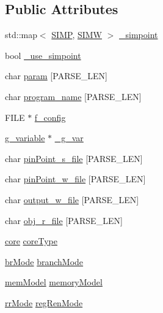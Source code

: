 \subsection*{Public Attributes}
\begin{DoxyCompactItemize}
\item 
std::map$<$ \hyperlink{global_2global_8h_a8de6a99590d1589b9e2eb7b208c517e8}{SIMP}, \hyperlink{global_2global_8h_ae8fb2e990993b1181540c8986c5d98e5}{SIMW} $>$ \hyperlink{classconfig_a66a2268284689ebce8e0fe2f87a2699d}{\_\-simpoint}
\item 
bool \hyperlink{classconfig_a2928e02fdf4716123e313e363e77875a}{\_\-use\_\-simpoint}
\item 
char \hyperlink{classconfig_adb1322ea6b15bd6c0387b2fe82e7c574}{param} \mbox{[}PARSE\_\-LEN\mbox{]}
\item 
char \hyperlink{classconfig_a344b61d2beb7dec897796ef42ed00010}{program\_\-name} \mbox{[}PARSE\_\-LEN\mbox{]}
\item 
FILE $\ast$ \hyperlink{classconfig_a3a5aaa62d616ead46e8b132c9305ea7f}{f\_\-config}
\item 
\hyperlink{structg__variable}{g\_\-variable} $\ast$ \hyperlink{classconfig_acfc11a499f94cd303747f5e58c447f36}{\_\-g\_\-var}
\item 
char \hyperlink{classconfig_a325327ce309f0152ce4e1a45bb097b09}{pinPoint\_\-s\_\-file} \mbox{[}PARSE\_\-LEN\mbox{]}
\item 
char \hyperlink{classconfig_afc8eae6d38b6e75182bb7a93c46542e3}{pinPoint\_\-w\_\-file} \mbox{[}PARSE\_\-LEN\mbox{]}
\item 
char \hyperlink{classconfig_a9101bb4e461cd4ec6012bb178eb3c392}{output\_\-w\_\-file} \mbox{[}PARSE\_\-LEN\mbox{]}
\item 
char \hyperlink{classconfig_ad0b1dacf1eb81162d514175543251908}{obj\_\-r\_\-file} \mbox{[}PARSE\_\-LEN\mbox{]}
\item 
\hyperlink{global_2global_8h_ab65a1cfe05166d06195718a9587d7b86}{core} \hyperlink{classconfig_a8d6774da02b8fae7f319212466d360ad}{coreType}
\item 
\hyperlink{global_2global_8h_a01e05efee3068c759b10b6181a6065e1}{brMode} \hyperlink{classconfig_a504ac31b890e1ae3ecf5ec1ab99621b3}{branchMode}
\item 
\hyperlink{global_2global_8h_a0685c5d42062f018dda85c9d62f3ac1f}{memModel} \hyperlink{classconfig_a8b53c1fcfcc74b75455423696309bf91}{memoryModel}
\item 
\hyperlink{global_2global_8h_a2bd5cbbaffd02af41175a938dc5da2f1}{rrMode} \hyperlink{classconfig_a2344640bb090fed4cf5e303c10028737}{regRenMode}

\end{DoxyCompactItemize}
